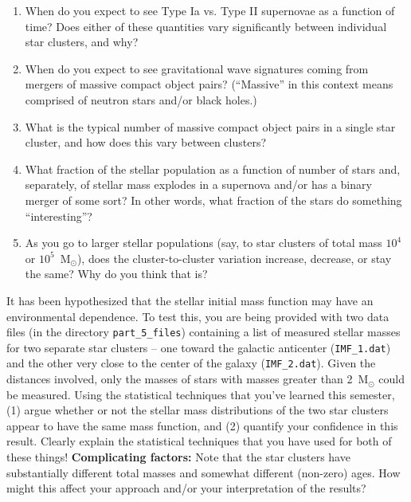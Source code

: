 \documentclass[10pt]{article}
\begin{document}
\begin{enumerate}

\item  When do you expect to see Type Ia vs. Type II supernovae as a
  function of time?  Does either of these quantities vary
  significantly between individual star clusters, and why?

\item When do you expect to see gravitational wave signatures coming
  from mergers of massive compact object pairs?   (``Massive'' in this context means comprised of
  neutron stars and/or black holes.)

\item What is the typical number of massive compact object pairs in a
  single star cluster, and how does this vary between clusters? 

\item What fraction of the stellar population as a function of number
  of stars and, separately, of stellar mass explodes in a
  supernova and/or has a binary merger of some sort?  In other words,
  what fraction of the stars do something ``interesting''?

\item As you go to larger stellar populations (say, to star clusters
  of total mass $10^4$ or $10^5$~M$_\odot$), does the
  cluster-to-cluster variation increase, decrease, or stay the same?
  Why do you think that is?
  
\end{enumerate}



\vspace{5mm}
  It has been hypothesized that the
stellar initial mass function may have an environmental dependence.
To test this, you are being provided with two data files (in the
directory \texttt{part\_5\_files}) containing a
list of measured stellar masses for two separate star clusters -- one
toward the galactic anticenter (\texttt{IMF\_1.dat}) and the other
very close to the center of the galaxy (\texttt{IMF\_2.dat}).  Given
the distances involved, only the masses of stars with masses greater
than 2~M$_\odot$ could be measured.  Using the statistical techniques
that you've learned this semester, (1) argue whether or not the
stellar mass distributions of the two star clusters appear to have the
same mass function, and (2) quantify your confidence in this result.
Clearly explain the statistical techniques that you have used for both
of these things!  \textbf{Complicating factors:} Note that the star
clusters have substantially different total masses and somewhat
different (non-zero) ages.  How might this affect your approach and/or
your interpretation of the results?
\end{document}
